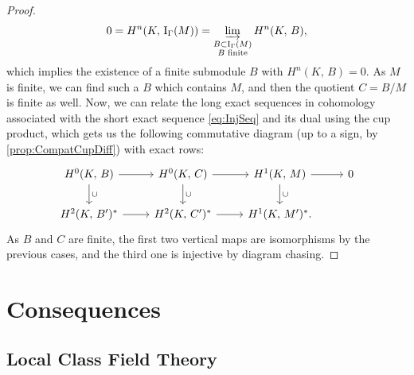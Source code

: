 \documentclass[a4paper]{report}
\def\K{K}
\renewcommand{\H}[3]{H^{#1}( #2, \, #3 )}
\newcommand{\Ind}[2]{\mathrm{I}_{#1}(#2)}
\theoremstyle{plain}
\theoremstyle{definition}
\theoremstyle{remark}
\begin{document}
\begin{proof}
    \[
        0=\H{n}{\K}{\Ind{\Gamma}{M}}=\varinjlim_{\substack{B\subset\Ind{\Gamma}{M} \\B\text{ finite}}}{\H{n}{\K}{B}},
    \]
    which implies the existence of a finite submodule \(B\) with \(\H{n}{\K}{B}=0\). As \(M\) is finite, we can find such a \(B\) which contains \(M\), and then
    the quotient \(C=B/M\) is finite as well.
    Now, we can relate the long exact sequences in cohomology associated with the short exact sequence \eqref{eq:InjSeq}
    and its dual using the cup product, which gets us the following commutative diagram (up to a sign, by \eqref{prop:CompatCupDiff}) with exact rows:
    \[
        \begin{tikzcd}
            \H{0}{\K}{B} \ar[r] \ar[d, "\cup"] & \H{0}{\K}{C} \ar[r] \ar[d, "\cup"] & \H{1}{\K}{M} \ar[d, "\cup"] \ar[r] & 0 \\
            \H{2}{\K}{B^\prime}^* \ar[r] & \H{2}{\K}{C^\prime}^* \ar[r] & \H{1}{\K}{M^\prime}^*.
        \end{tikzcd}
    \]
    As \(B\) and \(C\) are finite, the first two vertical maps are isomorphisms by the previous cases, and the third one is injective by diagram chasing.

\end{proof}


\chapter{Consequences}

\section{Local Class Field Theory}


\nocite{*}
\printbibliography
\end{document}
